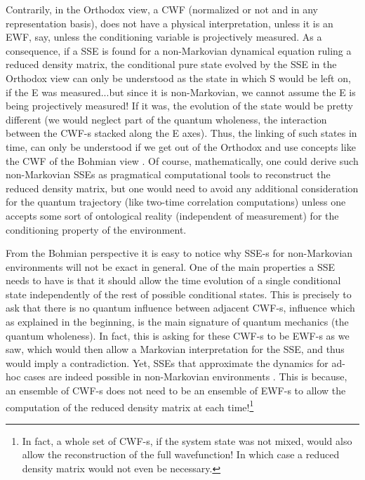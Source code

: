 \documentclass[11pt, a4paper]{article} %
\begin{document}
Contrarily, in the Orthodox view, a CWF (normalized or not and in any representation basis), does not have a physical interpretation, unless it is an EWF, say, unless the conditioning variable is projectively measured. As a consequence, if a SSE is found for a non-Markovian dynamical equation ruling a reduced density matrix, the conditional pure state evolved by the SSE in the Orthodox view can only be understood as the state in which S would be left on, if the E was measured...but since it is non-Markovian, we cannot assume the E is being projectively measured! If it was, the evolution of the state would be pretty different (we would neglect part of the quantum wholeness, the interaction between the CWF-s stacked along the E axes). Thus, the linking of such states in time, can only be understood if we get out of the Orthodox and use concepts like the CWF of the Bohmian view \cite{NMisModal, interpretSSE}. Of course, mathematically, one could derive such non-Markovian SSEs as pragmatical computational tools to reconstruct the reduced density matrix, but one would need to avoid any additional consideration for the quantum trajectory (like two-time correlation computations) unless one accepts some sort of ontological reality (independent of measurement) for the conditioning property of the environment.

From the Bohmian perspective it is easy to notice why SSE-s for non-Markovian environments will not be exact in general. One of the main properties a SSE needs to have is that it should allow the time evolution of a single conditional state independently of the rest of possible conditional states. This is precisely to ask that there is no quantum influence between adjacent CWF-s, influence which as explained in the beginning, is the main signature of quantum mechanics (the quantum wholeness). In fact, this is asking for these CWF-s to be EWF-s as we saw, which would then allow a Markovian interpretation for the SSE, and thus would imply a contradiction. Yet, SSEs that approximate the dynamics for ad-hoc cases are indeed possible in non-Markovian environments \cite{ Diosi, WisemanSSE, Thz}. This is because, an ensemble of CWF-s does not need to be an ensemble of EWF-s to allow the computation of the reduced density matrix at each time!\footnote{In fact, a whole set of CWF-s, if the system state was not mixed, would also allow the reconstruction of the full wavefunction! In which case a reduced density matrix would not even be necessary.} 
\end{document}
